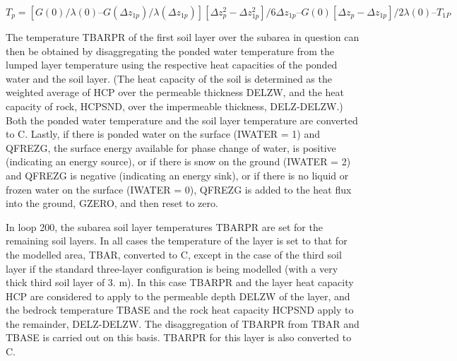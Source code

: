 $T_p = [G(0)/ \lambda(0) – G(\Delta z_{1p})/ \lambda(\Delta z_{1p})] [\Delta z_p^2 - \Delta z_{1p}^2]/ 6 \Delta z_{1p} – G(0) [\Delta z_p - \Delta z_{1p}]/ 2 \lambda(0) – T_{1P}$

The temperature T\+B\+A\+R\+P\+R of the first soil layer over the subarea in question can then be obtained by disaggregating the ponded water temperature from the lumped layer temperature using the respective heat capacities of the ponded water and the soil layer. (The heat capacity of the soil is determined as the weighted average of H\+C\+P over the permeable thickness D\+E\+L\+Z\+W, and the heat capacity of rock, H\+C\+P\+S\+N\+D, over the impermeable thickness, D\+E\+L\+Z-\/\+D\+E\+L\+Z\+W.) Both the ponded water temperature and the soil layer temperature are converted to C. Lastly, if there is ponded water on the surface (I\+W\+A\+T\+E\+R = 1) and Q\+F\+R\+E\+Z\+G, the surface energy available for phase change of water, is positive (indicating an energy source), or if there is snow on the ground (I\+W\+A\+T\+E\+R = 2) and Q\+F\+R\+E\+Z\+G is negative (indicating an energy sink), or if there is no liquid or frozen water on the surface (I\+W\+A\+T\+E\+R = 0), Q\+F\+R\+E\+Z\+G is added to the heat flux into the ground, G\+Z\+E\+R\+O, and then reset to zero.

In loop 200, the subarea soil layer temperatures T\+B\+A\+R\+P\+R are set for the remaining soil layers. In all cases the temperature of the layer is set to that for the modelled area, T\+B\+A\+R, converted to C, except in the case of the third soil layer if the standard three-\/layer configuration is being modelled (with a very thick third soil layer of 3. m). In this case T\+B\+A\+R\+P\+R and the layer heat capacity H\+C\+P are considered to apply to the permeable depth D\+E\+L\+Z\+W of the layer, and the bedrock temperature T\+B\+A\+S\+E and the rock heat capacity H\+C\+P\+S\+N\+D apply to the remainder, D\+E\+L\+Z-\/\+D\+E\+L\+Z\+W. The disaggregation of T\+B\+A\+R\+P\+R from T\+B\+A\+R and T\+B\+A\+S\+E is carried out on this basis. T\+B\+A\+R\+P\+R for this layer is also converted to C.